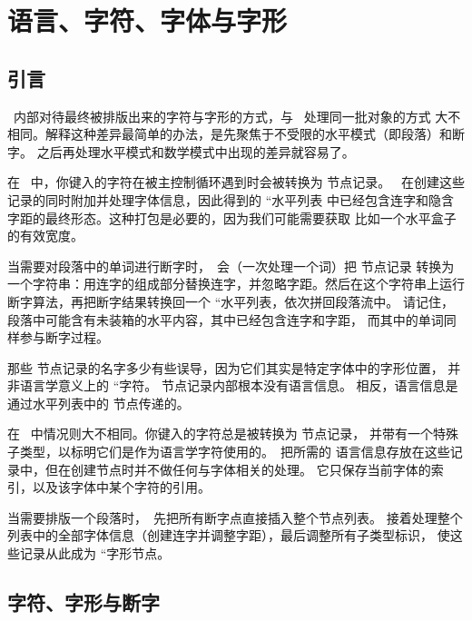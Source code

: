 \chapter{语言、字符、字体与字形}\label{languages}

\section{引言}


\LUATEX\ 内部对待最终被排版出来的字符与字形的方式，与 \ 处理同一批对象的方式
大不相同。解释这种差异最简单的办法，是先聚焦于不受限的水平模式（即段落）和断字。
之后再处理水平模式和数学模式中出现的差异就容易了。

在 \ 中，你键入的字符在被主控制循环遇到时会被转换为  节点记录。
\TEX\ 在创建这些记录的同时附加并处理字体信息，因此得到的 ``水平列表
中已经包含连字和隐含字距的最终形态。这种打包是必要的，因为我们可能需要获取
比如一个水平盒子的有效宽度。

当需要对段落中的单词进行断字时，\TEX\ 会（一次处理一个词）把  节点记录
转换为一个字符串：用连字的组成部分替换连字，并忽略字距。然后在这个字符串上运行
断字算法，再把断字结果转换回一个 ``水平列表，依次拼回段落流中。
请记住，段落中可能含有未装箱的水平内容，其中已经包含连字和字距，
而其中的单词同样参与断字过程。

那些  节点记录的名字多少有些误导，因为它们其实是特定字体中的字形位置，
并非语言学意义上的 ``字符。 节点记录内部根本没有语言信息。
相反，语言信息是通过水平列表中的  节点传递的。

在 \LUATEX\ 中情况则大不相同。你键入的字符总是被转换为  节点记录，
并带有一个特殊子类型，以标明它们是作为语言学字符使用的。\LUATEX\ 把所需的
语言信息存放在这些记录中，但在创建节点时并不做任何与字体相关的处理。
它只保存当前字体的索引，以及该字体中某个字符的引用。

当需要排版一个段落时，\LUATEX\ 先把所有断字点直接插入整个节点列表。
接着处理整个列表中的全部字体信息（创建连字并调整字距），最后调整所有子类型标识，
使这些记录从此成为 ``字形节点。

\section{字符、字形与断字}\label{charsandglyphs}


